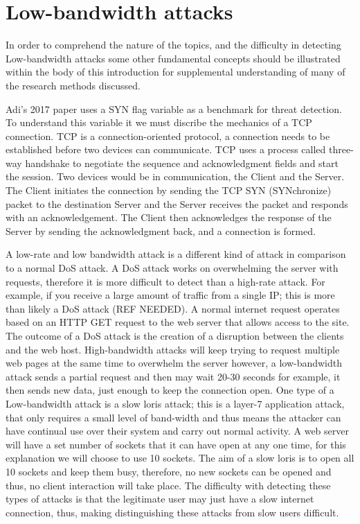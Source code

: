 
\section{Low-bandwidth attacks} \label{attack1}

In order to comprehend the nature of the topics, and the difficulty in detecting Low-bandwidth attacks some other fundamental concepts should be illustrated within the body of this introduction for supplemental understanding of many of the research methods discussed.

Adi's 2017 paper uses a SYN flag variable as a benchmark for threat detection. To understand this variable it we must discribe the mechanics of a TCP connection. TCP is a connection-oriented protocol, a connection needs to be established before two devices can communicate. TCP uses a process called three-way handshake to negotiate the sequence and acknowledgment fields and start the session. Two devices would be in communication, the Client and the Server. The Client initiates the connection by sending the TCP SYN (SYNchronize) packet to the destination Server and the Server receives the packet and responds with an acknowledgement. The Client then acknowledges the response of the Server by sending the acknowledgment back, and a connection is formed. 

A low-rate and low bandwidth attack is a different kind of attack in comparison to a normal DoS attack. A DoS attack works on overwhelming the server with requests, therefore it is more difficult to detect than a high-rate attack. For example, if you receive a large amount of traffic from a single IP; this is more than likely a DoS attack (REF NEEDED). A normal internet request operates based on an HTTP GET request to the web server that allows access to the site. The outcome of a DoS attack is the creation of a disruption between the clients and the web host. High-bandwidth attacks will keep trying to request multiple web pages at the same time to overwhelm the server however, a low-bandwidth attack sends a partial request and then may wait 20-30 seconds for example, it then sends new data, just enough to keep the connection open. One type of a Low-bandwidth attack is a slow loris attack; this is a layer-7 application attack, that only requires a small level of band-width and thus means the attacker can have continual use over their system and carry out normal activity. A web server will have a set number of sockets that it can have open at any one time, for this explanation we will choose to use 10 sockets. The aim of a slow loris is to open all 10 sockets and keep them busy, therefore, no new sockets can be opened and thus, no client interaction will take place. The difficulty with detecting these types of attacks is that the legitimate user may just have a slow internet connection, thus, making distinguishing these attacks from slow users difficult. 

